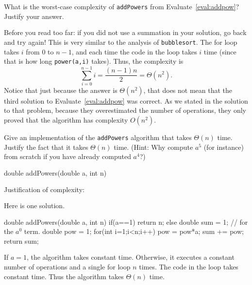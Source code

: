 \newpage

\begin{exer}
What is the worst-case complexity of \verb+addPowers+ from Evaluate~\ref{eval:addpow}?
Justify your answer.

\vspace*{2.25in}
\begin{answer}
Before you read too far: 
if you did not use a summation in your solution, go back and try again!
This is very similar to the analysis of \verb+bubblesort+.  The for loop takes $i$ from
$0$ to $n-1$, and each time the code in the loop takes $i$ time (since that is how long
\verb+power(a,i)+ takes).  Thus, the complexity is 
$$\sum_{i=0}^{n-1} i = \frac{(n-1)n}{2}=\Theta(n^2).$$
Notice that just because the answer is $\Theta(n^2)$, that does not mean that the
third solution to Evaluate~\ref{eval:addpow} was correct.  As we stated in the solution
to that problem, because they overestimated the number of operations,
they only proved that the algorithm has complexity $O(n^2)$.
\end{answer}
\end{exer}

\begin{exer}
Give an implementation of the \verb+addPowers+ algorithm that takes $\Theta(n)$ time.
Justify the fact that it takes $\Theta(n)$ time. 
(Hint: Why compute $a^5$ (for instance) from scratch if you have already computed $a^4$?)
\begin{code}
	  double addPowers(double a, int n) {
	     
	     
	     
	     
	     
	     
	     
	     
	     
	     
	     
	     
	     
	     
	     
	     
	  }
\end{code}
Justification of complexity:

\vspace*{1.25in}
\begin{answer}
Here is one solution.
\begin{code}
	  double addPowers(double a, int n) {
	      if(a==1) {
	          return n;
	      } else {
	          double sum = 1; // for the $a^0$ term.
	          double pow = 1;
	          for(int i=1;i<n;i++) {
	              pow = pow*a;
	              sum += pow; 
	          }
	          return sum;
	      }
	  }
\end{code} 
If $a=1$, the algorithm takes constant time.
Otherwise, it executes a constant number of operations and a single for loop $n$ times.
The code in the loop takes constant time.  
Thus the algorithm takes $\Theta(n)$ time.
\end{answer} 
\end{exer}

